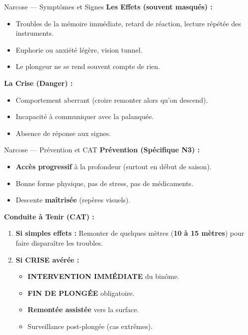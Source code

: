 \begin{frame}{Narcose — Symptômes et Signes}
    \textbf{Les Effets (souvent masqués) :}
    \begin{itemize}
        \item Troubles de la mémoire immédiate, retard de réaction, lecture répétée des instruments.
        \item Euphorie ou anxiété légère, vision tunnel.
        \item Le plongeur ne se rend souvent compte de rien.
    \end{itemize}

    \textbf{La Crise (\textcolor{ffessmred}{Danger}) :}
    \begin{itemize}
        \item Comportement aberrant (croire remonter alors qu'on descend).
        \item Incapacité à communiquer avec la palanquée.
        \item Absence de réponse aux signes.
    \end{itemize}
\end{frame}

\begin{frame}{Narcose — Prévention et CAT}
    \textbf{Prévention (Spécifique N3) :}
    \begin{itemize}
        \item \textbf{\textcolor{ffessmred}{Accès progressif}} à la profondeur (surtout en début de saison).
        \item Bonne forme physique, pas de stress, pas de médicaments.
        \item Descente \textbf{\textcolor{ffessmred}{maîtrisée}} (repères visuels).
    \end{itemize}

    \textbf{Conduite à Tenir (CAT) :}
    \begin{enumerate}
        \item \textbf{Si simples effets :} \textcolor{ffessmred}{Remonter de quelques mètres} (\textbf{10 à 15 mètres}) pour faire disparaître les troubles.
        \item \textbf{Si CRISE avérée :}
        \begin{itemize}
            \item \textbf{INTERVENTION IMMÉDIATE} du binôme.
            \item \textbf{\textcolor{ffessmred}{FIN DE PLONGÉE}} obligatoire.
            \item \textbf{Remontée assistée} vers la surface.
            \item Surveillance post-plongée (cas extrêmes).
        \end{itemize}
    \end{enumerate}
\end{frame}

